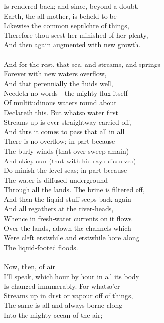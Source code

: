 Is rendered back; and since, beyond a doubt,\\
Earth, the all-mother, is beheld to be\\
Likewise the common sepulchre of things,\\
Therefore thou seest her minished of her plenty,\\
And then again augmented with new growth.\\
\\
And for the rest, that sea, and streams, and springs\\
Forever with new waters overflow,\\
And that perennially the fluids well,\\
Needeth no words—the mighty flux itself\\
Of multitudinous waters round about\\
Declareth this. But whatso water first\\
Streams up is ever straightway carried off,\\
And thus it comes to pass that all in all\\
There is no overflow; in part because\\
The burly winds (that over-sweep amain)\\
And skiey sun (that with his rays dissolves)\\
Do minish the level seas; in part because\\
The water is diffused underground\\
Through all the lands. The brine is filtered off,\\
And then the liquid stuff seeps back again\\
And all regathers at the river-heads,\\
Whence in fresh-water currents on it flows\\
Over the lands, adown the channels which\\
Were cleft erstwhile and erstwhile bore along\\
The liquid-footed floods.\\
\\
Now, then, of air\\
I'll speak, which hour by hour in all its body\\
Is changed innumerably. For whatso'er\\
Streams up in dust or vapour off of things,\\
The same is all and always borne along\\
Into the mighty ocean of the air;\\
